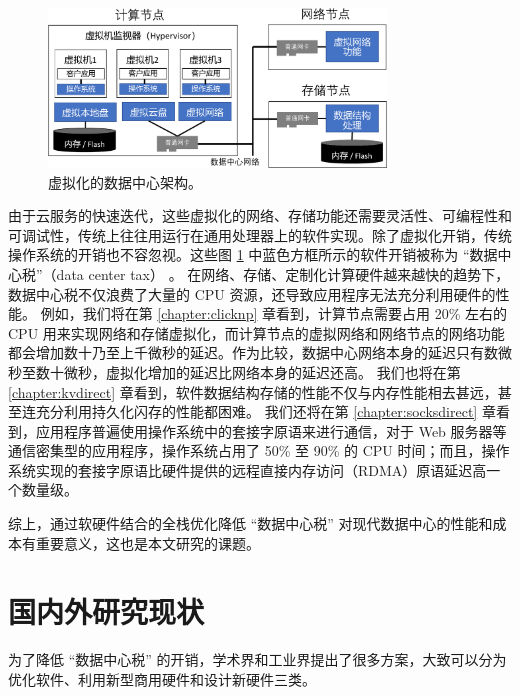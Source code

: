 \begin{figure}[htbp]
	\centering
	\includegraphics[width=0.8\textwidth]{figures/virt_arch.pdf}
	\caption{虚拟化的数据中心架构。}
	\label{intro:fig:virt-architecture}
\end{figure}


由于云服务的快速迭代，这些虚拟化的网络、存储功能还需要灵活性、可编程性和可调试性，传统上往往用运行在通用处理器上的软件实现。除了虚拟化开销，传统操作系统的开销也不容忽视。这些图 \ref{intro:fig:virt-architecture} 中蓝色方框所示的软件开销被称为 ``数据中心税''（data center tax） \cite{barroso2009datacenter,barroso2013datacenter,barroso2017attack,barroso2018datacenter}。
在网络、存储、定制化计算硬件越来越快的趋势下，数据中心税不仅浪费了大量的 CPU 资源，还导致应用程序无法充分利用硬件的性能。
例如，我们将在第 \ref{chapter:clicknp} 章看到，计算节点需要占用 20\% 左右的 CPU 用来实现网络和存储虚拟化，而计算节点的虚拟网络和网络节点的网络功能都会增加数十乃至上千微秒的延迟。作为比较，数据中心网络本身的延迟只有数微秒至数十微秒，虚拟化增加的延迟比网络本身的延迟还高。
我们也将在第 \ref{chapter:kvdirect} 章看到，软件数据结构存储的性能不仅与内存性能相去甚远，甚至连充分利用持久化闪存的性能都困难。
我们还将在第 \ref{chapter:socksdirect} 章看到，应用程序普遍使用操作系统中的套接字原语来进行通信，对于 Web 服务器等通信密集型的应用程序，操作系统占用了 50\% 至 90\% 的 CPU 时间；而且，操作系统实现的套接字原语比硬件提供的远程直接内存访问（RDMA）原语延迟高一个数量级。

综上，通过软硬件结合的全栈优化降低 ``数据中心税'' 对现代数据中心的性能和成本有重要意义，这也是本文研究的课题。





\section{国内外研究现状}

为了降低 ``数据中心税'' 的开销，学术界和工业界提出了很多方案，大致可以分为优化软件、利用新型商用硬件和设计新硬件三类。

